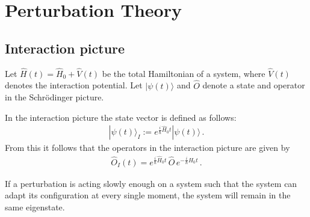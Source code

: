 \chapter{Perturbation Theory}

\section{Interaction picture}\label{section:interaction_picture}

    Let $\hat{H}(t)=\hat{H}_0+\hat{V}(t)$ be the total Hamiltonian of a system, where $\hat{V}(t)$ denotes the interaction potential. Let $|\psi(t)\rangle$ and $\hat{O}$ denote a state and operator in the Schr\"odinger picture.
    \begin{definition}
        In the interaction picture the state vector is defined as follows:
        \begin{gather}
            |\psi(t)\rangle_I := e^{\tfrac{i}{\hbar}\hat{H}_0t}|\psi(t)\rangle\,.
        \end{gather}
        From this it follows that the operators in the interaction picture are given by
        \begin{gather}
            \hat{O}_I(t) = e^{\tfrac{i}{\hbar}\hat{H}_0t}\,\hat{O}\,e^{-\tfrac{i}{\hbar}\hat{H}_0t}\,.
        \end{gather}
    \end{definition}

    \begin{theorem}
        If a perturbation is acting slowly enough on a system such that the system can adapt its configuration at every single moment, the system will remain in the same eigenstate.
    \end{theorem}

